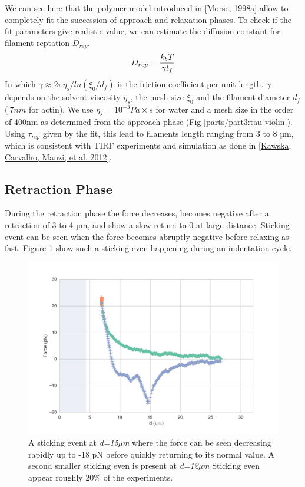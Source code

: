 \documentclass[A4paperpaper,11pt,english]{sphinxmanual}
\begin{document}
We can see here that the polymer model introduced in {\hyperref[parts/part3:morse1998a]{{[}Morse,  1998a{]}}} allow
to completely fit the succession of approach and relaxation phases.  To check if
the fit parameters give realistic value, we can estimate the diffusion constant
for filament reptation \(D_{rep}\).
\begin{gather}
\begin{split}D_{rep} &= \frac{k_bT}{\gamma l_f} \\\end{split}\notag
\end{gather}
In which \(\gamma\approx {2\pi\eta_s}/{ln(\xi_0/d_f)}\) is the friction
coefficient per unit length. \(\gamma\) depends on the solvent viscosity
\(\eta_s\), the mesh-size \(\xi_0\) and the filament diameter
\(d_f\) (\(~7nm\) for actin).  We use \(\eta_s=10^{-3} Pa\times s\)
for water and a mesh size in the order of 400nm as determined from the approach phase
(\hyperref[parts/part3:tau-violin]{Fig  \ref*{parts/part3:tau-violin}}). Using \(\tau_{rep}\) given by the fit, this lead to filaments
length ranging from 3 to 8 µm, which is consistent with TIRF experiments and simulation as done in {\hyperref[parts/part3:kawska2012]{{[}Kawska, Carvalho, Manzi,  et al.  2012{]}}}.


\subsection{Retraction Phase}
\label{parts/part3:retraction-phase}
During the retraction phase the force decreases, becomes negative after a
retraction of 3 to 4 µm, and show a slow  return to 0 at large distance.
Sticking event can be seen when the force becomes abruptly negative before
relaxing as fast. \hyperref[parts/part3:sticking-event]{Figure  \ref*{parts/part3:sticking-event}} show such a sticking even
happening during an indentation cycle.
\begin{figure}[htbp]
\centering
\capstart

\includegraphics[width=0.800\linewidth]{sticking-event.png}
\caption{A sticking event at \emph{d=15µm} where the force can be seen decreasing rapidly
up to -18 pN before quickly returning to its normal value. A second smaller
sticking even is present at \emph{d=12µm} Sticking even appear roughly 20\% of
the experiments.}\label{parts/part3:sticking-event}\end{figure}
\end{document}
